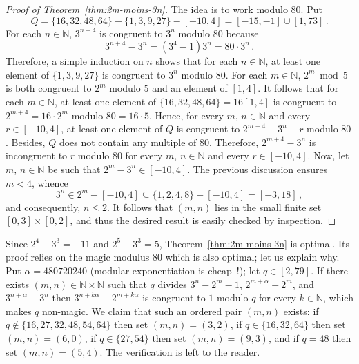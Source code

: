 \documentclass[12pt]{article}
\newcommand{\bZ}{\mathbb{Z}}
\newcommand{\bN}{\mathbb{N}} %
\theoremstyle{definition}
\begin{document}
   \begin{proof}[Proof of Theorem~\ref{thm:2m-moins-3n}]
     The idea is to work modulo $80$.
     Put  
     $$
     Q  = \{ 16, 32, 48, 64 \}  - \{ 1, 3, 9, 27 \}  - [- 10, 4] = [-15, - 1] \cup [1, 73] \,.
     $$
     For each $n \in \bN$,
     $3^{n + 4}$ is congruent to $3^n$ modulo $80$ because 
     $$3^{n + 4} - 3^n =  (3^4 - 1) 3^n = 80 \cdot  3^n \, .
     $$
     Therefore,
     a simple induction on $n$ shows that for each $n \in \bN$,
     at least one element of $\{ 1, 3, 9, 27 \}$ is congruent to $3^n$ modulo $80$.
     For each $m \in \bN$,
     $2^m \bmod 5$
     is both congruent to $2^m$ modulo $5$ and an element of $[1, 4]$.
     It follows that for each $m \in \bN$,
     at least one element of
     $\{ 16, 32, 48, 64 \} = 16 [1, 4]$ is congruent to $2^{m + 4}  = 16  \cdot 2^m$ modulo $80 = 16 \cdot 5$.
     Hence, for every $m$, $n \in \bN$ and every $r \in [-10, 4]$, 
     at least one element of $Q$ is congruent to $2^{m + 4} - 3^n - r$ modulo $80$.
     Besides, $Q$ does not contain any multiple of $80$.
     Therefore,
     $2^{m + 4}  - 3^n$ is incongruent to $r$ modulo $80$
     for every $m$, $n \in \bN$ and every $r \in [- 10, 4]$.
     Now, let $m$, $n \in \bN$ be such that $2^m - 3^n \in [-10, 4]$.
     The previous discussion ensures $m < 4$,
     whence  
     $$
     3^n \in 2^m - [- 10, 4] \subseteq \{ 1, 2, 4, 8 \} - [- 10, 4] = [ -3, 18] \, ,
     $$
     and consequently, $n \le 2$.
     It follows that $(m, n)$ lies in the small finite set $[0, 3] \times [0, 2]$,
     and thus the desired result is easily checked by inspection.
   \end{proof}

   Since $2^4 - 3^3 = - 11$ and $2^5 - 3^3 = 5$,
   Theorem~\ref{thm:2m-moins-3n} is optimal.
   Its proof relies on the magic modulus $80$ which is also optimal; let us explain why.
   Put $\alpha = 480720240$ (modular exponentiation is cheap~!);
   let $q \in [2, 79]$.
   If there exists $(m, n) \in \bN \times \bN$ such that
   $q$ divides $3^n - 2^m - 1$, $2^{m + \alpha} - 2^m$, and $3^{n + \alpha} - 3^n$
   then
   $3^{n + k \alpha} - 2^{m + k \alpha}$ is congruent to $1$ modulo $q$ for every $k \in \bN$,
   which makes $q$ non-magic. 
   We claim that such an ordered pair $(m, n)$ exists: 
   if $q \notin \{ 16, 27, 32, 48, 54, 64 \}$ then set $(m, n) = (3, 2)$,
   if $q \in \{ 16, 32, 64 \}$ then set $(m, n) = (6, 0)$, 
   if $q \in \{ 27, 54 \}$ then set $(m, n) = (9, 3)$, and 
   if $q = 48$ then set $(m, n) = (5, 4)$.
   The verification is left to the reader.
\end{document}
